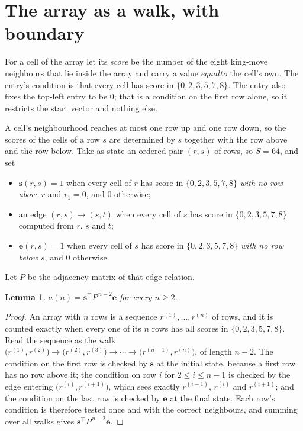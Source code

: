 \documentclass[11pt,a4paper]{article}
\theoremstyle{plain}
\newtheorem{lemma}[theorem]{Lemma}
\theoremstyle{definition}
\begin{document}
\section{The array as a walk, with boundary}

For a cell of the array let its \emph{score} be the number of the eight king-move neighbours that lie inside
the array and carry a value $equal to$ the cell's own. The entry's condition is that every cell
has score in $\{0,2,3,5,7,8\}$. The entry also fixes the top-left entry to be $0$; that is a condition on the first row alone, so it restricts the start vector and nothing else.

A cell's neighbourhood reaches at most one row up and one row down, so the scores of the
cells of a row $s$ are determined by $s$ together with the row above and the row below.
Take as state an ordered pair $(r,s)$ of rows, so $S=64$, and set
\begin{itemize}
\item $\mathbf{s}(r,s)=1$ when every cell of $r$ has score in $\{0,2,3,5,7,8\}$ \emph{with no row
above $r$} and $r_1=0$, and $0$ otherwise;
\item an edge $(r,s)\to(s,t)$ when every cell of $s$ has score in $\{0,2,3,5,7,8\}$ computed from
$r$, $s$ and $t$;
\item $\mathbf{e}(r,s)=1$ when every cell of $s$ has score in $\{0,2,3,5,7,8\}$ \emph{with no row
below $s$}, and $0$ otherwise.
\end{itemize}
Let $P$ be the adjacency matrix of that edge relation.

\begin{lemma}\label{lem:walk}
$a(n)=\mathbf{s}^{\!\top}P^{\,n-2}\mathbf{e}$ for every $n\ge2$.
\end{lemma}

\begin{proof}
An array with $n$ rows is a sequence $r^{(1)},\dots,r^{(n)}$ of rows, and it is counted
exactly when every one of its $n$ rows has all scores in $\{0,2,3,5,7,8\}$. Read the sequence as the
walk $\bigl(r^{(1)},r^{(2)}\bigr)\to\bigl(r^{(2)},r^{(3)}\bigr)\to\cdots\to
\bigl(r^{(n-1)},r^{(n)}\bigr)$, of length $n-2$. The condition on the first row is
checked by $\mathbf{s}$ at the initial state, because a first row has no row above it; the
condition on row $i$ for $2\le i\le n-1$ is checked by the edge entering
$\bigl(r^{(i)},r^{(i+1)}\bigr)$, which sees exactly $r^{(i-1)}$, $r^{(i)}$ and
$r^{(i+1)}$; and the condition on the last row is checked by $\mathbf{e}$ at the final
state. Each row's condition is therefore tested once and with the correct neighbours, and
summing over all walks gives $\mathbf{s}^{\!\top}P^{\,n-2}\mathbf{e}$.
\end{proof}
\end{document}
